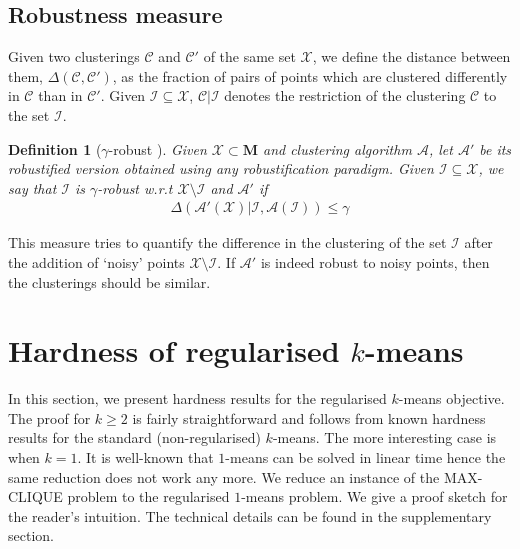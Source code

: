 \documentclass[12pt]{article}
\newcommand{\mc}{\mathcal}
\newcommand{\mb}{\mathbf}
\newtheorem{definition}[theorem]{Definition}
\begin{document}
\subsection{Robustness measure}
Given two clusterings $\mc C$ and $\mc C'$ of the same set $\mc X$, we define the distance between them, $\Delta(\mc C, \mc C')$, as the fraction of pairs of points which are clustered differently in $\mc C$ than in $\mc C'$. %
Given $\mc I \subseteq \mc X$, $\mc C|\mc I$ denotes the restriction of the clustering $\mc C$ to the set $\mc I$.

\begin{definition}[$\gamma$-robust \cite{ben2014clustering}]
Given $\mc X\subset \mb M$ and clustering algorithm $\mc A$, let $\mc A'$ be its robustified version obtained using any robustification paradigm. Given $\mc I \subseteq \mc X$, we say that $\mc I$ is $\gamma$-robust w.r.t $\mc X \setminus \mc I$ and $\mc A'$ if 
\begin{align}
\Delta(\mc A'(\mc X)|\mc I, \mc A(\mc I)) \le \gamma
\end{align}
\end{definition}
This measure tries to quantify the difference in the clustering of the set $\mc I$ after the addition of `noisy' points $\mc X \setminus \mc I$. If $\mc A'$ is indeed robust to noisy points, then the clusterings should be similar. 



\section{Hardness of regularised $k$-means}
\label{section:hardness}

In this section, we present hardness results for the regularised $k$-means objective. 
The proof for $k \ge 2$ is fairly straightforward and follows from known hardness results for the standard (non-regularised) $k$-means. The more interesting case is when $k = 1$. It is well-known that $1$-means can be solved in linear time \cite{Bellman73} hence the same reduction does not work any more. We reduce an instance of the MAX-CLIQUE problem to the regularised $1$-means problem. We give a proof sketch for the reader's intuition. The technical details can be found in the supplementary section.
\end{document}
